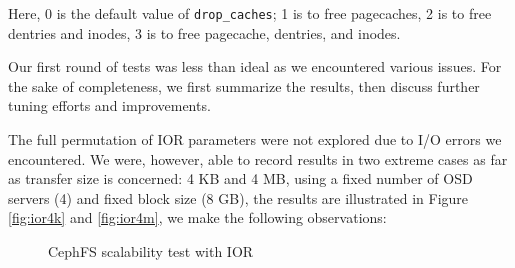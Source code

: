 Here, 0 is the default value of \verb!drop_caches!; 1 is to free pagecaches, 2
is to free dentries and inodes, 3 is to free pagecache, dentries, and inodes.


Our first round of tests was less than ideal as we encountered various issues. For
the sake of completeness, we first summarize the results, then discuss
further tuning efforts and improvements.

The full permutation of IOR parameters were not explored due to I/O errors we encountered.
We were, however, able to record results in two extreme cases as far as
transfer size is concerned: 4 KB and 4 MB, using a fixed number of OSD servers
(4) and fixed block size (8 GB), the results are illustrated in Figure
\ref{fig:ior4k} and \ref{fig:ior4m}, we make the following observations:


\begin{figure}[!t]

\centerline{
\hfil
{}
}%
\caption{CephFS scalability test with IOR}

\end{figure}


